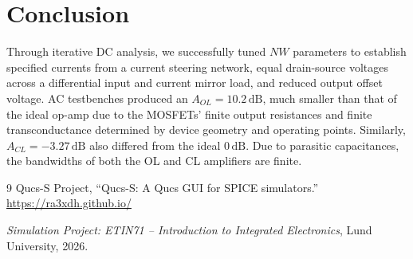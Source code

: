 \documentclass[11pt,a4paper]{article}
\begin{document}
\section{Conclusion}

Through iterative DC analysis, we successfully tuned $NW$ parameters to establish specified currents from a current steering network, equal drain-source voltages across a differential input and current mirror load, and reduced output offset voltage. 
AC testbenches produced an $A_{OL}=10.2\,\mathrm{dB}$, much smaller than that of the ideal op-amp due to the MOSFETs' finite output resistances and finite transconductance determined by device geometry and operating points. Similarly, $A_{CL}=-3.27\,\mathrm{dB}$ also differed from the ideal $0\,\mathrm{dB}$.
Due to parasitic capacitances, the bandwidths of both the OL and CL amplifiers are finite.

\begin{thebibliography}{9}
Qucs-S Project, ``Qucs-S: A Qucs GUI for SPICE simulators.''
\url{https://ra3xdh.github.io/}

\emph{Simulation Project: ETIN71 -- Introduction to Integrated Electronics}, Lund University, 2026.
\end{thebibliography}
\end{document}
